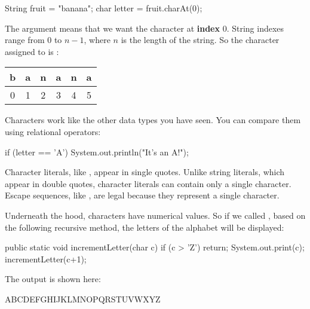\begin{code}
String fruit = "banana";
char letter = fruit.charAt(0);
\end{code}

The argument  means that we want the character at {\bf index} 0.
String indexes range from 0 to $n-1$, where $n$ is the length of the string.
So the character assigned to  is :

\begin{center}
\ttfamily
\begin{tabular}{cccccc}
\hline
\multicolumn{1}{|l|}{b} & \multicolumn{1}{l|}{a} & \multicolumn{1}{l|}{n} & \multicolumn{1}{l|}{a} & \multicolumn{1}{l|}{n} & \multicolumn{1}{l|}{a} \\ \hline
0                       & 1                      & 2                      & 3                      & 4                      & 5
\end{tabular}
\end{center}

Characters work like the other data types you have seen.
You can compare them using relational operators:

\begin{code}
if (letter == 'A') {
    System.out.println("It's an A!");
}
\end{code}


Character literals, like , appear in single quotes.
Unlike string literals, which appear in double quotes, character literals can contain only a single character.
Escape sequences, like , are legal because they represent a single character.

Underneath the hood, characters have numerical values.
So if we called ,
based on the following recursive method, 
the letters of the alphabet will be displayed:

\begin{code}
public static void incrementLetter(char c) {
    if (c > 'Z') {
      return;
    }
    System.out.print(c);
    incrementLetter(c+1);
}
\end{code}

The output is shown here:

\begin{stdout}
ABCDEFGHIJKLMNOPQRSTUVWXYZ
\end{stdout}


